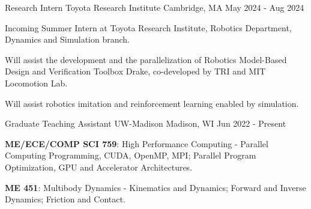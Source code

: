 

\begin{cventries}
	
	
	
	
	\cventry
	{Research Intern} %
	{Toyota Research Institute} %
	{Cambridge, MA} %
	{May 2024 - Aug 2024} %
	{
		\begin{cvitems} %
			\item {Incoming Summer Intern at Toyota Research Institute, Robotics Department, Dynamics and Simulation branch.}
			\item {Will assist the development and the parallelization of Robotics Model-Based Design and Verification Toolbox Drake, co-developed by TRI and MIT Locomotion Lab.}
			\item{Will assist robotics imitation and reinforcement learning enabled by simulation.}
		\end{cvitems}
	}
	
	
	
	\cventry
	{Graduate Teaching Assistant} %
	{UW-Madison} %
	{Madison, WI} %
	{Jun 2022 - Present} %
	{
		\begin{cvitems} %
			\item {\textbf{ME/ECE/COMP SCI 759}: High Performance Computing - Parallel Computing Programming, CUDA, OpenMP, MPI; Parallel Program Optimization, GPU and Accelerator Architectures.}
			\item {\textbf{ME 451}: Multibody Dynamics - Kinematics and Dynamics; Forward and Inverse Dynamics; Friction and Contact.}
		\end{cvitems}
	}
	
	
	

\end{cventries}
